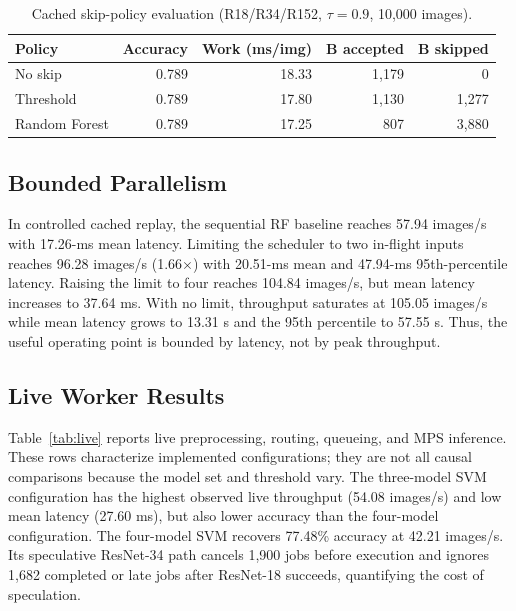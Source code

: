 \begin{table}[t]
\caption{Cached skip-policy evaluation (R18/R34/R152, $\tau=0.9$, 10,000 images).}
\label{tab:skip}
\centering
\small
\begin{tabular}{lrrrr}
\hline
Policy & Accuracy & Work (ms/img) & B accepted & B skipped \\
\hline
No skip & 0.789 & 18.33 & 1,179 & 0 \\
Threshold & 0.789 & 17.80 & 1,130 & 1,277 \\
Random Forest & 0.789 & 17.25 & 807 & 3,880 \\
\hline
\end{tabular}
\end{table}

\subsection{Bounded Parallelism}

In controlled cached replay, the sequential RF baseline reaches 57.94
images/s with 17.26-ms mean latency.  Limiting the scheduler to two in-flight
inputs reaches 96.28 images/s (1.66$\times$) with 20.51-ms mean and 47.94-ms
95th-percentile latency.  Raising the limit to four reaches 104.84 images/s,
but mean latency increases to 37.64 ms.  With no limit, throughput saturates at
105.05 images/s while mean latency grows to 13.31 s and the 95th percentile to
57.55 s.  Thus, the useful operating point is bounded by latency, not by peak
throughput.

\subsection{Live Worker Results}

Table~\ref{tab:live} reports live preprocessing, routing, queueing, and MPS
inference.  These rows characterize implemented configurations; they are not
all causal comparisons because the model set and threshold vary.  The
three-model SVM configuration has the highest observed live throughput
(54.08 images/s) and low mean latency (27.60 ms), but also lower accuracy than
the four-model configuration.  The four-model SVM recovers 77.48\% accuracy at
42.21 images/s.  Its speculative ResNet-34 path cancels 1,900 jobs before
execution and ignores 1,682 completed or late jobs after ResNet-18 succeeds,
quantifying the cost of speculation.

